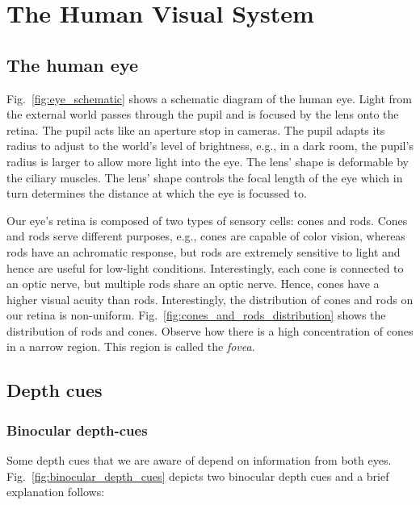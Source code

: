 \section{The Human Visual System}
\label{sec:background:hvs}
\subsection{The human eye}



Fig.~\ref{fig:eye_schematic} shows a schematic diagram of the human eye. 
Light from the external world passes through the pupil and is focused by the lens onto the retina. 
The pupil acts like an aperture stop in cameras. 
The pupil adapts its radius to adjust to the world’s level of brightness, e.g., in a dark room, the pupil’s radius is larger to allow more light into the eye. 
The lens’ shape is deformable by the ciliary muscles. 
The lens’ shape controls the focal length of the eye which in turn determines the distance at which the eye is focussed to.



Our eye’s retina is composed of two types of sensory cells: cones and rods. 
Cones and rods serve different purposes, e.g., cones are capable of color vision, whereas rods have an achromatic response, but rods are extremely sensitive to light and hence are useful for low-light conditions.
Interestingly, each cone is connected to an optic nerve, but multiple rods share an optic nerve. 
Hence, cones have a higher visual acuity than rods. 
Interestingly, the distribution of cones and rods on our retina is non-uniform. 
Fig.~\ref{fig:cones_and_rods_distribution} shows the distribution of rods and cones. 
Observe how there is a high concentration of cones in a narrow region. This region is called the \emph{fovea}.

\subsection{Depth cues}
\label{sec:background:depth_cues}
\subsubsection{Binocular depth-cues}
Some depth cues that we are aware of depend on information from both eyes. Fig.~\ref{fig:binocular_depth_cues} depicts two binocular depth cues and a brief explanation follows:

